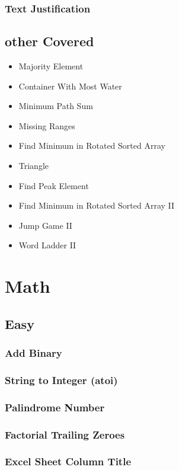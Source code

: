 \documentclass[12pt]{book}
\begin{document}
\subsection{Text Justification}
\label{sec-20-1-12}
\section{other Covered}
\label{sec-20-2}
\begin{itemize}
\item Majority Element
\item Container With Most Water
\item Minimum Path Sum
\item Missing Ranges
\item Find Minimum in Rotated Sorted Array
\item Triangle
\item Find Peak Element
\item Find Minimum in Rotated Sorted Array II
\item Jump Game II
\item Word Ladder II
\end{itemize}

\chapter{Math}
\label{sec-21}
\section{Easy}
\label{sec-21-1}
\subsection{Add Binary}
\label{sec-21-1-1}
\subsection{String to Integer (atoi)}
\label{sec-21-1-2}
\subsection{Palindrome Number}
\label{sec-21-1-3}
\subsection{Factorial Trailing Zeroes}
\label{sec-21-1-4}
\subsection{Excel Sheet Column Title}
\label{sec-21-1-5}
\end{document}
